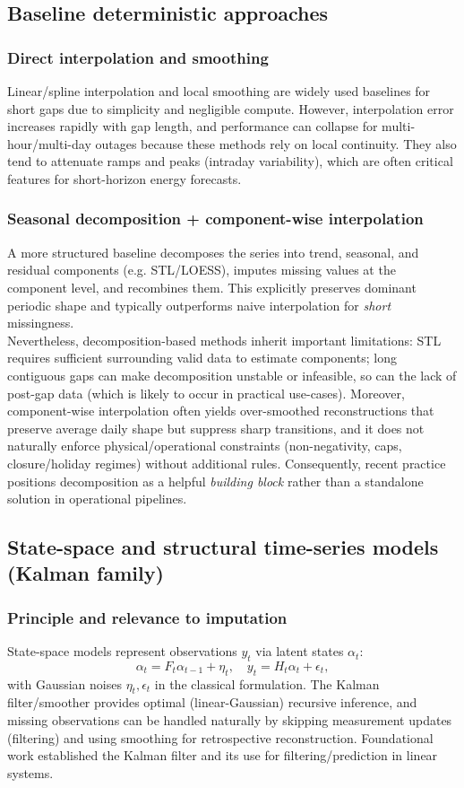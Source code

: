 \subsection{Baseline deterministic approaches}
\subsubsection{Direct interpolation and smoothing}
Linear/spline interpolation and local smoothing are widely used baselines for short gaps due to simplicity and negligible compute. However, interpolation error increases rapidly with gap length, and performance can collapse for multi-hour/multi-day outages because these methods rely on local continuity. They also tend to attenuate ramps and peaks (intraday variability), which are often critical features for short-horizon energy forecasts.%
% 

\subsubsection{Seasonal decomposition + component-wise interpolation}
A more structured baseline decomposes the series into trend, seasonal, and residual components (e.g. STL/LOESS), imputes missing values at the component level, and recombines them. This explicitly preserves dominant periodic shape and typically outperforms naive interpolation for \emph{short} missingness.\\%
% 

Nevertheless, decomposition-based methods inherit important limitations: STL requires sufficient surrounding valid data to estimate components; long contiguous gaps can make decomposition unstable or infeasible, so can the lack of post-gap data (which is likely to occur in practical use-cases). Moreover, component-wise interpolation often yields over-smoothed reconstructions that preserve average daily shape but suppress sharp transitions, and it does not naturally enforce physical/operational constraints (non-negativity, caps, closure/holiday regimes) without additional rules. Consequently, recent practice positions decomposition as a helpful \emph{building block} rather than a standalone solution in operational pipelines.%
% 

\subsection{State-space and structural time-series models (Kalman family)}
\subsubsection{Principle and relevance to imputation}
State-space models represent observations $y_t$ via latent states $\alpha_t$:
$$
\alpha_t = F_t \alpha_{t-1} + \eta_t,\quad y_t = H_t \alpha_t + \epsilon_t,
$$
with Gaussian noises $\eta_t,\epsilon_t$ in the classical formulation. The Kalman filter/smoother provides optimal (linear-Gaussian) recursive inference, and missing observations can be handled naturally by skipping measurement updates (filtering) and using smoothing for retrospective reconstruction. Foundational work established the Kalman filter and its use for filtering/prediction in linear systems.%

